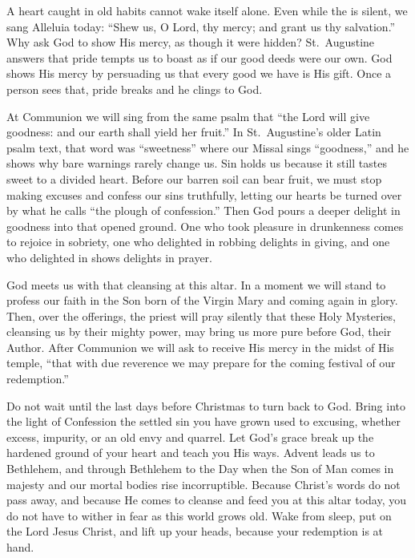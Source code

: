 A heart caught in old habits cannot wake itself alone. Even while the  is silent, we sang Alleluia today: ``Shew us, O Lord, thy mercy; and grant us thy salvation.'' Why ask God to show His mercy, as though it were hidden? St.~Augustine answers that pride tempts us to boast as if our good deeds were our own. God shows His mercy by persuading us that every good we have is His gift. Once a person sees that, pride breaks and he clings to God.

At Communion we will sing from the same psalm that ``the Lord will give goodness: and our earth shall yield her fruit.'' In St.~Augustine's older Latin psalm text, that word was ``sweetness'' where our Missal sings ``goodness,'' and he shows why bare warnings rarely change us. Sin holds us because it still tastes sweet to a divided heart. Before our barren soil can bear fruit, we must stop making excuses and confess our sins truthfully, letting our hearts be turned over by what he calls ``the plough of confession.'' Then God pours a deeper delight in goodness into that opened ground. One who took pleasure in drunkenness comes to rejoice in sobriety, one who delighted in robbing delights in giving, and one who delighted in shows delights in prayer.

God meets us with that cleansing at this altar. In a moment we will stand to profess our faith in the Son born of the Virgin Mary and coming again in glory. Then, over the offerings, the priest will pray silently that these Holy Mysteries, cleansing us by their mighty power, may bring us more pure before God, their Author. After Communion we will ask to receive His mercy in the midst of His temple, ``that with due reverence we may prepare for the coming festival of our redemption.''

Do not wait until the last days before Christmas to turn back to God. Bring into the light of Confession the settled sin you have grown used to excusing, whether excess, impurity, or an old envy and quarrel. Let God's grace break up the hardened ground of your heart and teach you His ways. Advent leads us to Bethlehem, and through Bethlehem to the Day when the Son of Man comes in majesty and our mortal bodies rise incorruptible. Because Christ's words do not pass away, and because He comes to cleanse and feed you at this altar today, you do not have to wither in fear as this world grows old. Wake from sleep, put on the Lord Jesus Christ, and lift up your heads, because your redemption is at hand.

